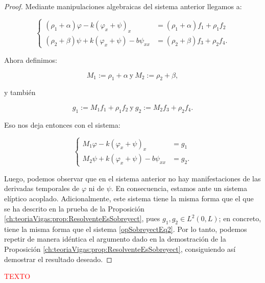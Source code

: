 \begin{proof}
    Mediante manipulaciones algebraicas del sistema anterior llegamos a:

    \begin{equation}
        \label{opSobreyectEq2DAmort}
        \begin{cases}
            (\rho_1 + \alpha)\varphi - k(\varphi_x + \psi)_x &= (\rho_1+\alpha)f_1 + \rho_1f_2\\
            (\rho_2+\beta)\psi + k(\varphi_x + \psi) - b\psi_{xx} &= (\rho_2 + \beta)f_3 + \rho_2f_4.
        \end{cases}
    \end{equation}

    Ahora definimos:

    \[M_1 := \rho_1 + \alpha \ \text{y} \ M_2 := \rho_2 + \beta,\]

    y también

    \[g_1 := M_1f_1 + \rho_1f_2 \ \text{y} \ g_2 := M_2f_3 + \rho_2f_4.\]

    Eso nos deja entonces con el sistema:

    \begin{equation*}
        \begin{cases}
            M_1\varphi - k(\varphi_x + \psi)_x &= g_1\\
            M_2\psi + k(\varphi_x + \psi) - b\psi_{xx} &= g_2.
        \end{cases}
    \end{equation*}
    
    Luego, podemos observar que en el sistema anterior no hay manifestaciones de las derivadas temporales de $\varphi$ ni de $\psi$. En consecuencia, estamos ante un sistema elíptico acoplado. Adicionalmente, este sistema tiene la misma forma que el que se ha descrito en la prueba de la Proposición \ref{ch:teoriaVigas:prop:ResolventeEsSobreyect}, pues $g_1, g_2 \in L^2(0,L)$; en concreto, tiene la misma forma que el sistema \eqref{opSobreyectEq2}. Por lo tanto, podemos repetir de manera idéntica el argumento dado en la demostración de la Proposición \ref{ch:teoriaVigas:prop:ResolventeEsSobreyect}, consiguiendo así demostrar el resultado deseado.
\end{proof}

\textcolor{red}{TEXTO}

